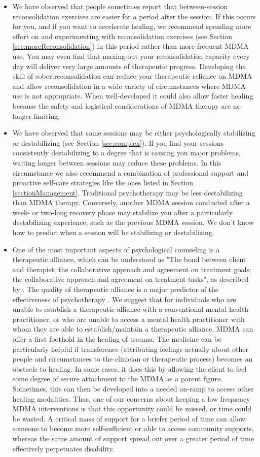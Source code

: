 \documentclass[12pt,letterpaper]{book}
\begin{document}
\begin{itemize}
    \item We have observed that people sometimes report that between-session reconsolidation exercises are easier for a period after the session. If this occurs for you, and if you want to accelerate healing, we recommend spending more effort on and experimenting with reconsolidation exercises (see Section \ref{sec:moreReconsolidation}) in this period rather than more frequent MDMA use. You may even find that maxing-out your reconsolidation capacity every day will deliver very large amounts of therapeutic progress. Developing the skill of sober reconsolidation can reduce your therapeutic reliance on MDMA and allow reconsolidation in a wide variety of circumstances where MDMA use is not appropriate. When well-developed it could also allow faster healing because the safety and logistical considerations of MDMA therapy are no longer limiting.
    \item We have observed that some sessions may be either psychologically stabilizing or destabilizing (see Section \ref{sec:complex}). If you find your sessions consistently destabilizing to a degree that is causing you major problems, waiting longer between sessions may reduce these problems. In this circumstance we also recommend a combination of professional support and proactive self-care strategies like the ones listed in Section \ref{sectionManagement}. Traditional psychotherapy may be less destabilizing than MDMA therapy. Conversely, another MDMA session conducted after a week- or two-long recovery phase may stabilize you after a particularly destabilizing experience, such as the previous MDMA session. We don't know how to predict when a session will be stabilizing or destabilizing.
    \item One of the most important aspects of psychological counseling is a therapeutic alliance, which can be understood as "The bond between client and therapist; the collaborative approach and agreement on treatment goals; the collaborative approach and agreement on treatment tasks", as described by \textcite{BRWAIdownload}. The quality of therapeutic alliance is a major predictor of the effectiveness of psychotherapy \cite{fluckiger2018alliance}. We suggest that for individuals who are unable to establish a therapeutic alliance with a conventional mental health practitioner, or who are unable to access a mental health practitioner with whom they are able to establish/maintain a therapeutic alliance, MDMA can offer a first foothold in the healing of trauma. The medicine can be particularly helpful if transference (attributing feelings actually about other people and circumstances to the clinician or therapeutic process) becomes an obstacle to healing. In some cases, it does this by allowing the client to feel some degree of secure attachment to the MDMA as a parent figure. Sometimes, this can then be developed into a needed on-ramp to access other healing modalities. Thus, one of our concerns about keeping a low frequency MDMA interventions is that this opportunity could be missed, or time could be wasted. A critical mass of support for a briefer period of time can allow someone to become more self-sufficient or able to access community supports, whereas the same amount of support spread out over a greater period of time effectively perpetuates disability.

\end{itemize}
\end{document}

